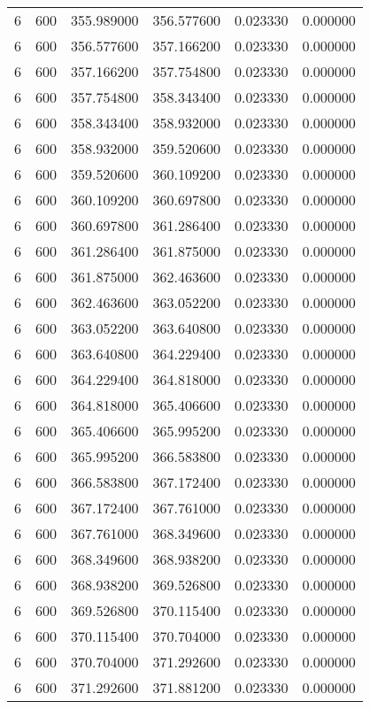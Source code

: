 \begin{longtable}{rrrrrr}
6 & 600 & 355.989000 & 356.577600 & 0.023330 & 0.000000 \\
6 & 600 & 356.577600 & 357.166200 & 0.023330 & 0.000000 \\
6 & 600 & 357.166200 & 357.754800 & 0.023330 & 0.000000 \\
6 & 600 & 357.754800 & 358.343400 & 0.023330 & 0.000000 \\
6 & 600 & 358.343400 & 358.932000 & 0.023330 & 0.000000 \\
6 & 600 & 358.932000 & 359.520600 & 0.023330 & 0.000000 \\
6 & 600 & 359.520600 & 360.109200 & 0.023330 & 0.000000 \\
6 & 600 & 360.109200 & 360.697800 & 0.023330 & 0.000000 \\
6 & 600 & 360.697800 & 361.286400 & 0.023330 & 0.000000 \\
6 & 600 & 361.286400 & 361.875000 & 0.023330 & 0.000000 \\
6 & 600 & 361.875000 & 362.463600 & 0.023330 & 0.000000 \\
6 & 600 & 362.463600 & 363.052200 & 0.023330 & 0.000000 \\
6 & 600 & 363.052200 & 363.640800 & 0.023330 & 0.000000 \\
6 & 600 & 363.640800 & 364.229400 & 0.023330 & 0.000000 \\
6 & 600 & 364.229400 & 364.818000 & 0.023330 & 0.000000 \\
6 & 600 & 364.818000 & 365.406600 & 0.023330 & 0.000000 \\
6 & 600 & 365.406600 & 365.995200 & 0.023330 & 0.000000 \\
6 & 600 & 365.995200 & 366.583800 & 0.023330 & 0.000000 \\
6 & 600 & 366.583800 & 367.172400 & 0.023330 & 0.000000 \\
6 & 600 & 367.172400 & 367.761000 & 0.023330 & 0.000000 \\
6 & 600 & 367.761000 & 368.349600 & 0.023330 & 0.000000 \\
6 & 600 & 368.349600 & 368.938200 & 0.023330 & 0.000000 \\
6 & 600 & 368.938200 & 369.526800 & 0.023330 & 0.000000 \\
6 & 600 & 369.526800 & 370.115400 & 0.023330 & 0.000000 \\
6 & 600 & 370.115400 & 370.704000 & 0.023330 & 0.000000 \\
6 & 600 & 370.704000 & 371.292600 & 0.023330 & 0.000000 \\
6 & 600 & 371.292600 & 371.881200 & 0.023330 & 0.000000 \\

\end{longtable}
